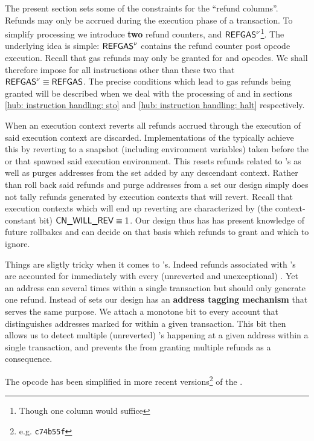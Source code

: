 The present section sets some of the constraints for the ``refund columns''.
Refunds may only be accrued during the execution phase of a transaction.
To simplify processing we introduce \textbf{two} refund counters,  and $\textsf{REFGAS}^{\nu}$\footnote{Though one column would suffice}.
The underlying idea is simple: $\textsf{REFGAS}^{\nu}$ contains the refund counter post opcode execution.
Recall that gas refunds may only be granted for 
 and
 opcodes.
We shall therefore impose for all instructions other than these two that $\textsf{REFGAS} ^{\nu} \equiv \textsf{REFGAS}$.
The precise conditions which lead to gas refunds being granted will be described when we deal with the processing of  and  in sections
\ref{hub: instruction handling: sto} and
\ref{hub: instruction handling: halt} respectively.

When an execution context reverts all refunds accrued through the execution of said execution context are discarded.
Implementations of the \evm{} typically achieve this by reverting to a snapshot (including environment variables) taken before the  or  that spawned said execution environment.
This resets refunds related to 's as well as purges addresses from the  set added by any descendant context.
Rather than roll back said refunds and purge addresses from a  set our \zkEvm{} design simply does not tally refunds generated by execution contexts that will revert.
Recall that execution contexts which will end up reverting are characterized by (the context-constant bit) $\textsf{CN}\textsf{\_WILL\_REV} \equiv 1$.
Our \zkEvm{} design thus has has present knowledge of future rollbakcs and can decide on that basis which refunds to grant and which to ignore.

Things are sligtly tricky when it comes to 's.
Indeed refunds associated with 's are accounted for immediately with every (unreverted and unexceptional) .
Yet an address can  several times within a single transaction but should only generate one refund.
Instead of  sets our \zkEvm{} design has an \textbf{address tagging mechanism} that serves the same purpose.
We attach a monotone bit to every account that distinguishes addresses marked for  within a given transaction.
This bit then allows us to detect multiple (unreverted) 's happening at a given address within a single transaction, and prevents the \zkEvm{} from granting multiple refunds as a consequence.

\saNote{} The  opcode has been simplified in more recent versions\footnote{e.g. \texttt{c74b55f}} of the \evm{}.
